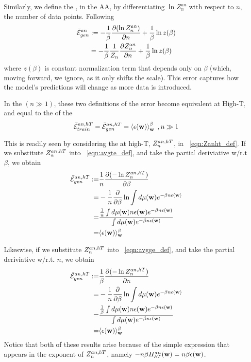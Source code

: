 {Similarly, 
we define the \emph{\AverageGeneralizationError}, in the AA,
by differentiating $\ln Z^{an}_{n}$ with respect to $n$, the number of data points.
Following 
\begin{align}
  \label{eqn:avgge_def}
  \bar{\mathcal{E}}_{gen}^{an}
&  := -\frac{1}{\beta}\dfrac{\partial (\ln Z^{an}_{n})}{\partial n}    +\frac{1}{\beta}\ln z(\beta)  \\ \nonumber
&  =  -\frac{1}{\beta}\frac{1}{Z_{n}}\dfrac{\partial Z^{an}_{n}}{\partial n}
  +\frac{1}{\beta}\ln z(\beta) 
\end{align}
where $z(\beta)$ is constant normalization term that depends only on $\beta$ (which, moving forward, we ignore, as it only shifts the scale).
This error captures how the model’s predictions will change as more data is introduced.

In the \ThermodynamicLimit $(n \gg 1)$, these two definitions of the error become equivalent at High-T,
and equal to the \ThermalAverage of the \EffectivePotential
\begin{align}
  \bar{\mathcal{E}}_{train}^{an, hT} = \bar{\mathcal{E}}_{gen}^{an, hT} = \left\langle \epsilon({\mathbf{w}}) \right\rangle_{\mathbf w}^{\beta}\;,n\gg 1
\end{align}

This is readily seen by considering the \Annealed \PartitionFunction at high-T, $Z^{an,hT}_{n}$, in \EQN~\ref{eqn:Zanht_def}.
If we substitute $Z^{an,hT}_{n}$ into \EQN~\ref{eqn:avgte_def}, and take the partial deriviative w/r.t $\beta$, we obtain
\begin{align}
  \label{eqn:avgte_anhT}
  \bar{\mathcal{E}}_{gen}^{an, hT} :=&\frac{1}{n}\dfrac{\partial (-\ln Z^{an,hT}_{n})}{\partial \beta}  \\ \nonumber
   =& - \dfrac{1}{n}\dfrac{\partial}{\partial \beta}\ln\int d\mu({\mathbf{w}})e^{-\beta n\epsilon({\mathbf{w}})} \\  \nonumber
   =&  \dfrac{
              \tfrac{1}{n}  \int  d\mu({\mathbf{w}}) n\epsilon({\mathbf{w}}) e^{-\beta n\epsilon({\mathbf{w}})} 
             }{
              \int  d\mu({\mathbf{w}}) e^{-\beta n\epsilon({\mathbf{w}})} 
   } \\ \nonumber
   =&\langle\epsilon({\mathbf{w}}) \rangle_{{\mathbf{w}}}^{\beta}
  \end{align}


Likeswise, if we substitute $Z^{an,hT}_{n}$ into \EQN~\ref{eqn:avgge_def}, and take the partial deriviative w/r.t. $n$, we obtain
\begin{align}
  \label{eqn:avgte_anhT}
    \bar{\mathcal{E}}_{gen}^{an, hT}  :=& \frac{1}{\beta}\dfrac{\partial (-\ln Z^{an,hT}_{n})}{\partial n} \\ \nonumber
    =& - \dfrac{1}{n}\dfrac{\partial}{\partial \beta}\ln\int d\mu({\mathbf{w}})e^{-\beta n\epsilon({\mathbf{w}})} \\  \nonumber
   =&  \dfrac{
              \tfrac{1}{\beta}  \int  d\mu({\mathbf{w}}) n\epsilon({\mathbf{w}}) e^{-\beta n\epsilon({\mathbf{w}})} 
             }{
     \int  d\mu({\mathbf{w}}) e^{-\beta n\epsilon({\mathbf{w}})} 
   } \\ \nonumber
   =&\langle\epsilon({\mathbf{w}}) \rangle_{{\mathbf{w}}}^{\beta}
  \end{align}
  Notice that both of these results arise
  because of the simple expression that appears in the exponent of $Z^{an,hT}_{n}$, namely $-n\beta H^{an}_{hT}({\mathbf{w}})=n\beta\epsilon({\mathbf{w}})$.


}
